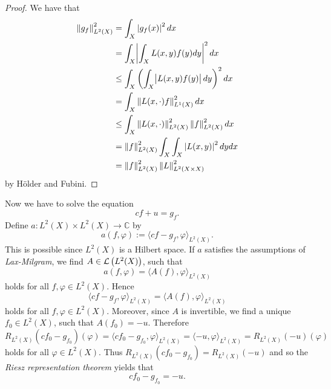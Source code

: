 \begin{enumerate}[label = \textbf{Exercise \arabic*.},wide = 0pt, itemsep = 1.5ex]
		\begin{proof}
			We have that
			\begin{align*}
				\norm[0]{g_f}_{L^2(X)}^2 &= \int_X \abs[0]{g_f(x)}^2 dx\\
				&= \int_X \abs[3]{\int_X L(x,y)f(y)dy}^2 dx\\
				&\leq \int_X \del[3]{\int_X \abs{L(x,y)f(y)}dy}^2 dx\\
				&= \int_X \norm[0]{L(x,\cdot)f}_{L^1(X)}^2 dx\\
			&\leq \int_X \norm[0]{L(x,\cdot)}_{L^2(X)}^2 \norm[0]{f}_{L^2(X)}^2 dx\\
			&= \norm[0]{f}_{L^2(X)}^2 \int_X \int_X \abs[0]{L(x,y)}^2dy dx\\
			&= \norm[0]{f}_{L^2(X)}^2 \norm[0]{L}_{L^2(X \times X)}^2
			\end{align*}
		\noindent by H\"older and Fubini.
		\end{proof}
		Now we have to solve the equation
		\begin{equation*}
			cf + u = g_f.
		\end{equation*}
		Define $a : L^2(X) \times L^2(X) \to \mathbb{C}$ by
		\begin{equation*}
			a(f,\varphi) := \langle cf - g_f, \varphi \rangle_{L^2(X)}.
		\end{equation*}
		This is possible since $L^2(X)$ is a Hilbert space. If $a$ satisfies the assumptions of \emph{Lax-Milgram}, we find $A \in \mathcal{L}\del[1]{L^2(X)}$, such that 
		\begin{equation*}
			a(f,\varphi) = \langle A(f),\varphi \rangle_{L^2(X)}
		\end{equation*}
		\noindent holds for all $f,\varphi \in L^2(X)$. Hence
		\begin{equation*}
			  \langle cf - g_f, \varphi \rangle_{L^2(X)} = \langle A(f),\varphi \rangle_{L^2(X)}
		\end{equation*}
		\noindent holds for all $f,\varphi \in L^2(X)$. Moreover, since $A$ is invertible, we find a unique $f_0 \in L^2(X)$, such that $A(f_0) = -u$. Therefore
		\begin{equation*}
			R_{L^2(X)}(cf_0 - g_{f_0})(\varphi) = \langle cf_0 - g_{f_0}, \varphi \rangle_{L^2(X)} = \langle -u,\varphi \rangle_{L^2(X)} = R_{L^2(X)}(-u)(\varphi)
		\end{equation*}
		\noindent holds for all $\varphi \in L^2(X)$. Thus $R_{L^2(X)}(cf_0 - g_{f_0}) = R_{L^2(X)}(-u)$ and so the \emph{Riesz representation theorem} yields that
		\begin{equation*}
			cf_0 - g_{f_0} = -u.
		\end{equation*}


\end{enumerate}
